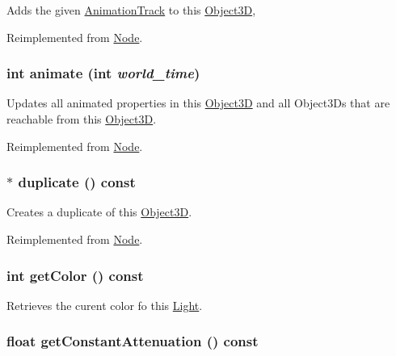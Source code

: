 Adds the given \hyperlink{classm3g_1_1AnimationTrack}{AnimationTrack} to this \hyperlink{classm3g_1_1Object3D}{Object3D}, 

Reimplemented from \hyperlink{classm3g_1_1Node_415c0b110f95410ded9b85e5d99a496b}{Node}.\hypertarget{classm3g_1_1Light_8aad1ceab4c2a03609c8a42324ce484d}{
\subsubsection[{animate}]{\setlength{\rightskip}{0pt plus 5cm}int animate (int {\em world\_\-time})}}
\label{classm3g_1_1Light_8aad1ceab4c2a03609c8a42324ce484d}


Updates all animated properties in this \hyperlink{classm3g_1_1Object3D}{Object3D} and all Object3Ds that are reachable from this \hyperlink{classm3g_1_1Object3D}{Object3D}. 

Reimplemented from \hyperlink{classm3g_1_1Node_8aad1ceab4c2a03609c8a42324ce484d}{Node}.\hypertarget{classm3g_1_1Light_7a41af040d0c1566358d84f089cd0cd1}{
\subsubsection[{duplicate}]{ $\ast$ duplicate () const}}
\label{classm3g_1_1Light_7a41af040d0c1566358d84f089cd0cd1}


Creates a duplicate of this \hyperlink{classm3g_1_1Object3D}{Object3D}. 

Reimplemented from \hyperlink{classm3g_1_1Node_0b9f7531a4b56d34f47aeb1fff0d37e0}{Node}.\hypertarget{classm3g_1_1Light_4cfa1931c265ec3412fe3f6408a1b4f5}{
\subsubsection[{getColor}]{\setlength{\rightskip}{0pt plus 5cm}int getColor () const}}
\label{classm3g_1_1Light_4cfa1931c265ec3412fe3f6408a1b4f5}


Retrieves the curent color fo this \hyperlink{classm3g_1_1Light}{Light}. \hypertarget{classm3g_1_1Light_9553ab96cb7639acafcebb81888af687}{
\subsubsection[{getConstantAttenuation}]{\setlength{\rightskip}{0pt plus 5cm}float getConstantAttenuation () const}}
\label{classm3g_1_1Light_9553ab96cb7639acafcebb81888af687}


